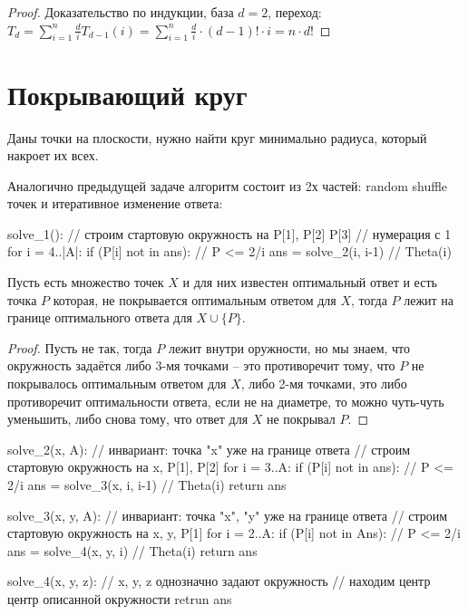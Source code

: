\begin{proof}
Доказательство по индукции, база $d = 2$, переход: 
$T_d = \sum_{i=1}^{n} \frac{d}{i} T_{d-1}(i) 
        = \sum_{i=1}^{n} \frac{d}{i} \cdot (d-1)! \cdot i = n \cdot d!$
\end{proof}

\section{Покрывающий круг}

Даны точки на плоскости, нужно найти круг минимально радиуса, который накроет их всех.

Аналогично предыдущей задаче алгоритм состоит из 2х частей: random shuffle точек
и итеративное изменение ответа:

\begin{cppcode}
solve_1():
    // строим стартовую окружность на P[1], P[2] P[3]
    // нумерация с 1
    for i = 4..|A|:
        if (P[i] not in ans):  // P <= 2/i
            ans = solve_2(i, i-1) // Theta(i)
\end{cppcode}

\begin{assert}
    Пусть есть множество точек $X$ и для них известен оптимальный ответ и есть точка $P$
    которая, не покрывается оптимальным ответом для $X$, тогда $P$ лежит на границе 
    оптимального ответа для $X \cup \{P\}$.
\end{assert}

\begin{proof}
   Пусть не так, тогда $P$ лежит внутри оружности, но мы знаем, что окружность задаётся либо
   3-мя точками -- это противоречит тому, что $P$ не покрывалось оптимальным ответом для $X$,
   либо 2-мя точками, это либо противоречит оптимальности ответа, если не на диаметре,
   то можно чуть-чуть уменьшить, либо снова тому, что ответ для $X$ не покрывал $P$.
\end{proof}

\begin{cppcode}
solve_2(x, A):
    // инвариант: точка "x" уже на границе ответа
    // строим стартовую окружность на x, P[1], P[2]
    for i = 3..A:
        if (P[i] not in ans):  // P <= 2/i
            ans = solve_3(x, i, i-1) // Theta(i)
    return ans

solve_3(x, y, A):
    // инвариант: точка "x", "y" уже на границе ответа
    // строим стартовую окружность на x, y, P[1]
    for i = 2..A:
	if (P[i] not in Ans):  // P <= 2/i
            ans = solve_4(x, y, i) // Theta(i)
    return ans

solve_4(x, y, z):
    // x, y, z однозначно задают окружность
    // находим центр центр описанной окружности
    retrun ans
\end{cppcode}

